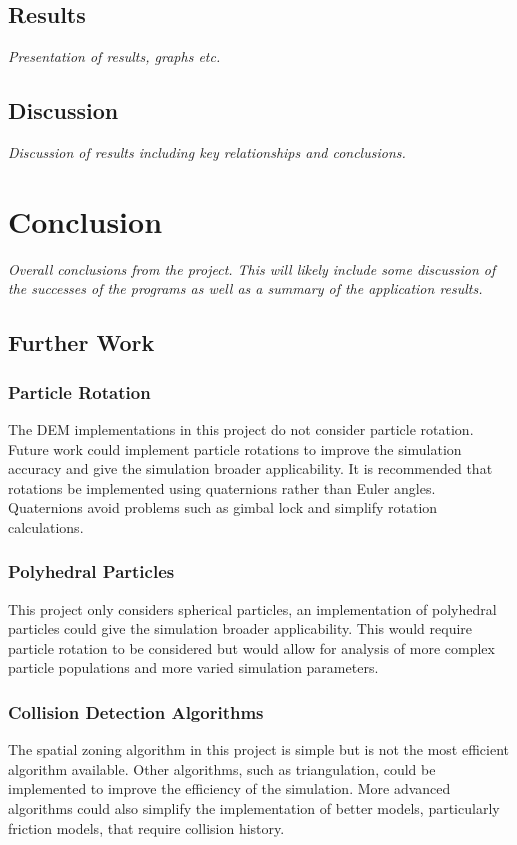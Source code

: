 \documentclass[10pt,a4paper,titlepage]{report}
\begin{document}
\section{Results}
\textit{Presentation of results, graphs etc.}
\section{Discussion}
\textit{Discussion of results including key relationships and conclusions.}
\chapter{Conclusion}
\textit{Overall conclusions from the project. This will likely include some discussion of the successes of the programs as well as a summary of the application results.}
\section{Further Work}
\subsection{Particle Rotation}
The DEM implementations in this project do not consider particle rotation. Future work could implement particle rotations to improve the simulation accuracy and give the simulation broader applicability. It is recommended that rotations be implemented using quaternions rather than Euler angles. Quaternions avoid problems such as gimbal lock and simplify rotation calculations.
\subsection{Polyhedral Particles}
This project only considers spherical particles, an implementation of polyhedral particles could give the simulation broader applicability. This would require particle rotation to be considered but would allow for analysis of more complex particle populations and more varied simulation parameters.
\subsection{Collision Detection Algorithms}
The spatial zoning algorithm in this project is simple but is not the most efficient algorithm available. Other algorithms, such as triangulation\cite{dynamictriangulations}, could be implemented to improve the efficiency of the simulation. More advanced algorithms could also simplify the implementation of better models, particularly friction models, that require collision history.
\end{document}
